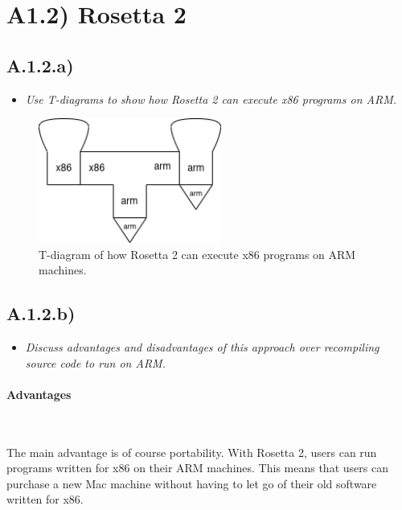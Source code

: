 \newpage
\section{A1.2) Rosetta 2}

\subsection{A.1.2.a)}

\begin{itemize}
    \item \emph{Use T-diagrams to show how Rosetta 2 can execute x86 programs on
      ARM.}
\end{itemize}


\begin{figure}[h]
\centering
\includegraphics[width=6cm]{../rosetta_2.png}
  \caption{{\scriptsize T-diagram of how Rosetta 2 can execute x86 programs on
  ARM machines.}}
\label{fig:rosetta_2}
\end{figure}

\sectend

\subsection{A.1.2.b)}

\begin{itemize}
    \item \emph{Discuss advantages and disadvantages of this approach over
      recompiling source code to run on ARM.}
\end{itemize}


\paragraph{Advantages}~\smallskip

The main advantage is of course portability. With Rosetta 2, users can run
programs written for x86 on their ARM machines. This means that users can
purchase a new Mac machine without having to let go of their old software
written for x86.

